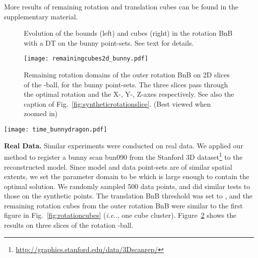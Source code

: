 \documentclass[10pt,journal,cspaper,compsoc]{IEEEtran}
\makeatletter
\DeclareRobustCommand\onedot{\futurelet\@let@token\@onedot}
\def\@onedot{\ifx\@let@token.\else.\null\fi\xspace}
\def\ie{\emph{i.e}\onedot} \def\Ie{\emph{I.e}\onedot}
\makeatother
\begin{document}
More results of remaining rotation and translation cubes can be found in the supplementary material.

\begin{figure}[!t]
\begin{center}
\vspace{-13pt}
\caption{Evolution of the bounds (left) and cubes (right) in the rotation BnB with a DT on the bunny point-sets. See text for details.
\label{fig:cubeevol}}
\end{center}
\vspace{-7pt}
\end{figure}

\begin{figure}[!t]
\begin{center}
\texttt{[image: remainingcubes2d\_bunny.pdf]}
\caption{Remaining rotation domains of the outer rotation BnB on 2D slices of the -ball, for the bunny point-sets. The three slices pass through the optimal rotation and the X-, Y-, Z-axes respectively. See also the caption of Fig.~\ref{fig:syntheticrotationslice}. (Best viewed when zoomed in)
\label{fig:bunnyrotationslice}}
\end{center}
\vspace{-7pt}
\end{figure}

\begin{figure*}[!t]
\begin{center}
\texttt{[image: time\_bunnydragon.pdf]}
\caption{Running time of the Go-ICP method with DTs on the bunny and dragon point-sets with respect to different factors. The evaluation was conducted on 10 data point-sets with 100 random poses (\ie, 1\,000 pairwise registrations).
\label{fig:time}}
\end{center}
\vspace{-8pt}
\end{figure*}

\vspace{0.06in}
\noindent\textbf{Real Data.} Similar experiments were conducted on real data. We applied our method to register a bunny scan bun090 from the Stanford 3D dataset\footnote{\url{http://graphics.stanford.edu/data/3Dscanrep/}} to the reconstructed model. Since model and data point-sets are of similar spatial extents, we set the parameter domain to be  which is large enough to contain the optimal solution. We randomly sampled 500 data points, and did similar tests to those on the synthetic points. The translation BnB threshold was set to , and the remaining rotation cubes from the outer rotation BnB were similar to the first figure in Fig.~\ref{fig:rotationcubes} (\ie, one cube cluster). Figure~\ref{fig:bunnyrotationslice} shows the results on three slices of the rotation -ball.
\end{document}
